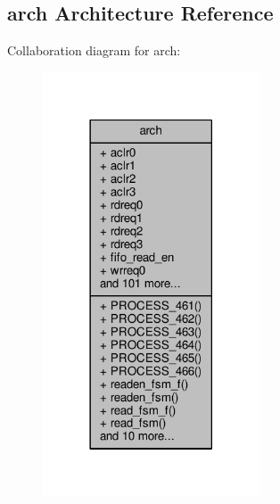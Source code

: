 \subsection{arch Architecture Reference}
\label{classtx__pct__data__mimo__v3_1_1arch}


Collaboration diagram for arch\+:\nopagebreak
\begin{figure}[H]
\begin{center}
\leavevmode
\includegraphics[width=182pt]{d4/d8c/classtx__pct__data__mimo__v3_1_1arch__coll__graph}
\end{center}
\end{figure}
